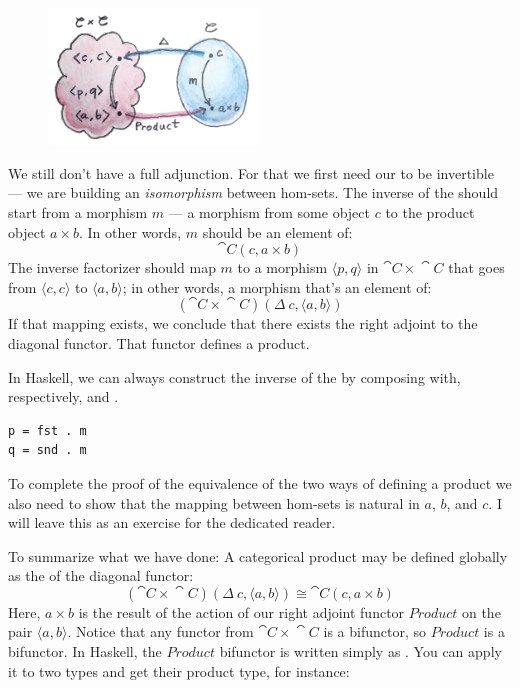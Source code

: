 \begin{figure}[H]
\centering
\includegraphics[width=0.5\textwidth]{images/adj-product.jpg}
\end{figure}

\noindent
We still don't have a full adjunction. For that we first need our
 to be invertible --- we are building an
\emph{isomorphism} between hom-sets. The inverse of the
 should start from a morphism $m$ --- a
morphism from some object $c$ to the product object $a\times{}b$.
In other words, $m$ should be an element of:
\[\cat{C}(c, a\times{}b)\]
The inverse factorizer should map $m$ to a morphism
$\langle p, q \rangle$ in $\cat{C}\times{}\cat{C}$ that goes from
$\langle c, c \rangle$ to
$\langle a, b \rangle$; in other words, a morphism
that's an element of:
\[(\cat{C}\times{}\cat{C})(\Delta\ c, \langle a, b \rangle)\]
If that mapping exists, we conclude that there exists the right adjoint
to the diagonal functor. That functor defines a product.

In Haskell, we can always construct the inverse of the
 by composing  with, respectively,
 and .

\begin{Verbatim}
p = fst . m
q = snd . m
\end{Verbatim}
To complete the proof of the equivalence of the two ways of defining a
product we also need to show that the mapping between hom-sets is
natural in $a$, $b$, and $c$. I will leave this as
an exercise for the dedicated reader.

To summarize what we have done: A categorical product may be defined
globally as the  of the diagonal functor:
\[(\cat{C}\times{}\cat{C})(\Delta\ c, \langle a, b \rangle) \cong \cat{C}(c, a\times{}b)\]
Here, $a\times{}b$ is the result of the action of our right adjoint
functor $Product$ on the pair
$\langle a, b \rangle$. Notice that any functor from
$\cat{C}\times{}\cat{C}$ is a bifunctor, so $Product$ is a bifunctor. In
Haskell, the $Product$ bifunctor is written simply as
\code{(,)}. You can apply it to two types and get their product type,
for instance:

